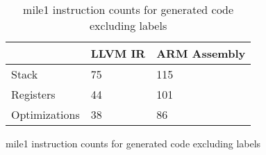 \begin{table}[h!]
\centering
\begin{tabular}{p{}p{}p{}}
  \hline
 & LLVM IR & ARM Assembly \\ 
  \hline
Stack &  75 & 115 \\ 
  Registers &  44 & 101 \\ 
  Optimizations &  38 &  86 \\ 
   \hline
\end{tabular}
\caption{mile1 instruction counts for generated code excluding labels}
\caption{mile1 instruction counts for generated code excluding labels}
\end{table}
